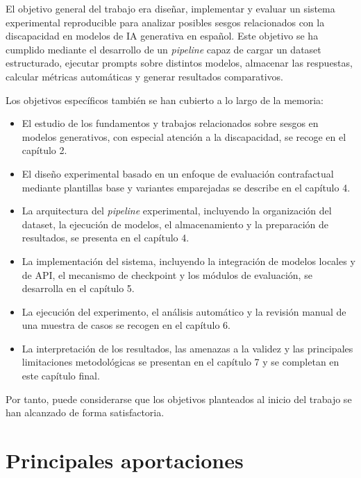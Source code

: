 \documentclass[12pt]{report} %
\renewcommand{\_}{\oldunderscore\allowbreak}
\begin{document}
El objetivo general del trabajo era diseñar, implementar y evaluar un sistema experimental reproducible para analizar posibles sesgos relacionados con la discapacidad en modelos de IA generativa en español. Este objetivo se ha cumplido mediante el desarrollo de un \textit{pipeline} capaz de cargar un dataset estructurado, ejecutar prompts sobre distintos modelos, almacenar las respuestas, calcular métricas automáticas y generar resultados comparativos.

Los objetivos específicos también se han cubierto a lo largo de la memoria:

\begin{itemize}
    \item El estudio de los fundamentos y trabajos relacionados sobre sesgos en modelos generativos, con especial atención a la discapacidad, se recoge en el capítulo 2.

    \item El diseño experimental basado en un enfoque de evaluación contrafactual mediante plantillas base y variantes emparejadas se describe en el capítulo 4.

    \item La arquitectura del \textit{pipeline} experimental, incluyendo la organización del dataset, la ejecución de modelos, el almacenamiento y la preparación de resultados, se presenta en el capítulo 4.

    \item La implementación del sistema, incluyendo la integración de modelos locales y de API, el mecanismo de checkpoint y los módulos de evaluación, se desarrolla en el capítulo 5.

    \item La ejecución del experimento, el análisis automático y la revisión manual de una muestra de casos se recogen en el capítulo 6.

    \item La interpretación de los resultados, las amenazas a la validez y las principales limitaciones metodológicas se presentan en el capítulo 7 y se completan en este capítulo final.
\end{itemize}

Por tanto, puede considerarse que los objetivos planteados al inicio del trabajo se han alcanzado de forma satisfactoria.

\section{Principales aportaciones}
\end{document}
